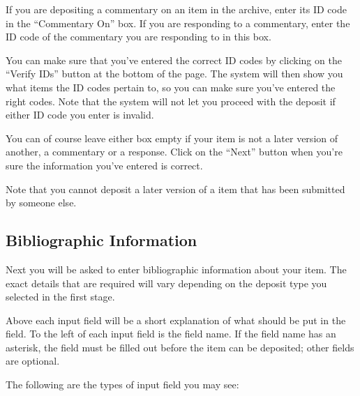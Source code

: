 If you are depositing a commentary on an item in the archive, enter its ID code in the ``Commentary On'' box. If you are responding to a commentary, enter the ID code of the commentary you are responding to in this box.

You can make sure that you've entered the correct ID codes by clicking on the ``Verify IDs'' button at the bottom of the page. The system will then show you what items the ID codes pertain to, so you can make sure you've entered the right codes. Note that the system will not let you proceed with the deposit if either ID code you enter is invalid.

You can of course leave either box empty if your item is not a later version of another, a commentary or a response. Click on the ``Next'' button when you're sure the information you've entered is correct.

Note that you cannot deposit a later version of a item that has been submitted by someone else.


\subsection{Bibliographic Information}

Next you will be asked to enter bibliographic information about your item. The exact details that are required will vary depending on the deposit type you selected in the first stage.

Above each input field will be a short explanation of what should be put in the field. To the left of each input field is the field name. If the field name has an asterisk, the field must be filled out before the item can be deposited; other fields are optional.

The following are the types of input field you may see:

